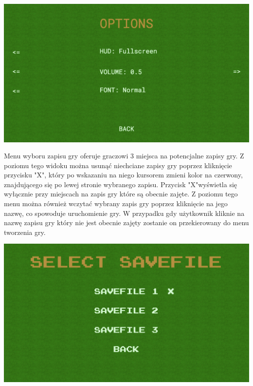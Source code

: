 \documentclass{article}
\begin{document}
\begin{center}
     \includegraphics[width=\textwidth]{optionsMenuSecondFont.png}
\end{center}
Menu wyboru zapisu gry oferuje graczowi 3 miejsca na potencjalne zapisy gry. Z poziomu tego widoku można usunąć niechciane zapisy gry poprzez kliknięcie przycisku "X", który po wskazaniu na niego kursorem zmieni kolor na czerwony, znajdującego się po lewej stronie wybranego zapisu. Przycisk "X"\space wyświetla się wyłącznie przy miejscach na zapis gry które są obecnie zajęte. Z poziomu tego menu można również wczytać wybrany zapis gry poprzez kliknięcie na jego nazwę, co spowoduje uruchomienie gry. W przypadku gdy użytkownik kliknie na nazwę zapisu gry który nie jest obecnie zajęty zostanie on przekierowany do menu tworzenia gry.
\begin{center}
     \includegraphics[width=\textwidth]{saveSelectMenu.png}
\end{center}
\end{document}
